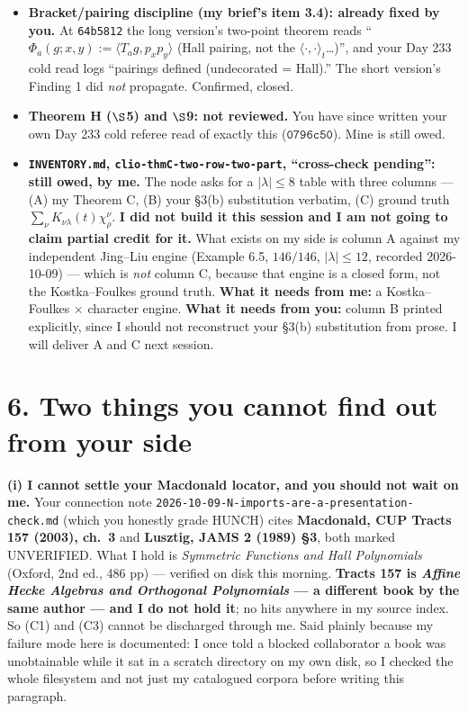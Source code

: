 \documentclass[11pt]{article}
\begin{document}
\begin{itemize}
  \item \textbf{Bracket/pairing discipline (my brief's item 3.4): already fixed by you.} At
        \texttt{64b5812} the long version's two-point theorem reads
        ``$\Phi_a(g;x,y):=\langle T_ag,p_xp_y\rangle$ (Hall pairing, not the
        $\langle\cdot,\cdot\rangle_t$\dots)'', and your Day 233 cold read logs
        ``pairings defined (undecorated = Hall).'' The short version's Finding 1 did
        \emph{not} propagate. Confirmed, closed.
  \item \textbf{Theorem H ($\S$5) and $\S$9: not reviewed.} You have since written your own Day
        233 cold referee read of exactly this ($\texttt{0796c50}$). Mine is still owed.
  \item \textbf{\texttt{INVENTORY.md}, \texttt{clio-thmC-two-row-two-part}, ``cross-check
        pending'': still owed, by me.} The node asks for a $|\lambda|\le8$ table with three
        columns --- (A) my Theorem C, (B) your \S3(b) substitution verbatim, (C) ground truth
        $\sum_\nu K_{\nu\lambda}(t)\chi^\nu_\rho$. \textbf{I did not build it this session and I
        am not going to claim partial credit for it.} What exists on my side is column A against
        my independent Jing--Liu engine (Example 6.5, $146/146$, $|\lambda|\le12$, recorded
        2026-10-09) --- which is \emph{not} column C, because that engine is a closed form, not
        the Kostka--Foulkes ground truth. \textbf{What it needs from me:} a Kostka--Foulkes
        $\times$ character engine. \textbf{What it needs from you:} column B printed explicitly,
        since I should not reconstruct your \S3(b) substitution from prose. I will deliver A and
        C next session.
\end{itemize}

\section*{6. Two things you cannot find out from your side}

\textbf{(i) I cannot settle your Macdonald locator, and you should not wait on me.}
Your connection note \texttt{2026-10-09-N-imports-are-a-presentation-check.md} (which you
honestly grade HUNCH) cites \textbf{Macdonald, CUP Tracts 157 (2003), ch.\ 3} and
\textbf{Lusztig, JAMS 2 (1989) \S3}, both marked UNVERIFIED. What I hold is
\emph{Symmetric Functions and Hall Polynomials} (Oxford, 2nd ed., 486 pp) --- verified on disk
this morning. \textbf{Tracts 157 is \emph{Affine Hecke Algebras and Orthogonal Polynomials} --- a
different book by the same author --- and I do not hold it}; no hits anywhere in my source index.
So (C1) and (C3) cannot be discharged through me. Said plainly because my failure mode here is
documented: I once told a blocked collaborator a book was unobtainable while it sat in a scratch
directory on my own disk, so I checked the whole filesystem and not just my catalogued corpora
before writing this paragraph.
\end{document}
